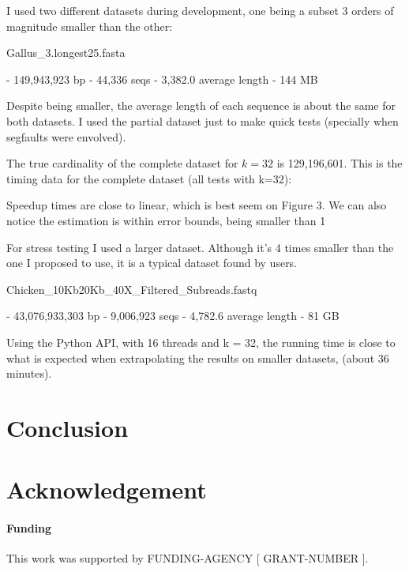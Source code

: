 \documentclass{bioinfo}
\begin{document}
I used two different datasets during development,
one being a subset 3 orders of magnitude smaller than the other:

Gallus\_3.longest25.fasta

  - 149,943,923 bp
  - 44,336 seqs
  - 3,382.0 average length
  - 144 MB

Despite being smaller,
the average length of each sequence is about the same for both datasets.
I used the partial dataset just to make quick tests
(specially when segfaults were envolved).

The true cardinality of the complete dataset for $k=32$ is 129,196,601.
This is the timing data for the complete dataset (all tests with k=32):

Speedup times are close to linear,
which is best seem on Figure 3.
We can also notice the estimation is within error bounds,
being smaller than 1%

For stress testing I used a larger dataset.
Although it's 4 times smaller than the one I proposed to use,
it is a typical dataset found by users.

Chicken\_10Kb20Kb\_40X\_Filtered\_Subreads.fastq

  - 43,076,933,303 bp
  - 9,006,923 seqs
  - 4,782.6 average length
  - 81 GB

Using the Python API, with 16 threads and k = 32,
the running time is close to what is expected when extrapolating the
results on smaller datasets,
(about 36 minutes).


\section{Conclusion}

\section*{Acknowledgement}

\paragraph{Funding\textcolon} This work was supported by FUNDING-AGENCY [ GRANT-NUMBER ].


%
%
%
%
%
%
%

\end{document}
